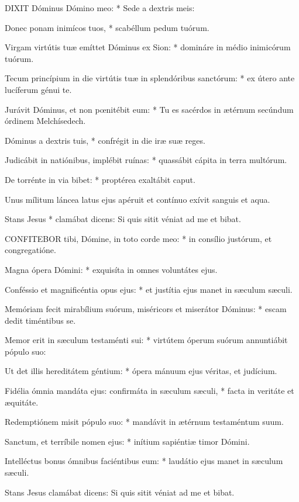 
\lettrine[lines=2]{D}{IXIT} Dóminus Dómino meo: * Sede a dextris meis:

Donec ponam inimícos tuos, * scabéllum pedum tuórum.

Virgam virtútis tuæ emíttet Dóminus ex Sion: * domináre in médio inimicórum tuórum.

Tecum princípium in die virtútis tuæ in splendóribus sanctórum: * ex útero ante lucíferum génui te.

Jurávit Dóminus, et non pœnitébit eum: * Tu es sacérdos in ætérnum secúndum órdinem Melchísedech.

Dóminus a dextris tuis, * confrégit in die iræ suæ reges.

Judicábit in natiónibus, implébit ruínas: * quassábit cápita in terra multórum.

De torrénte in via bibet: * proptérea exaltábit caput.

 Unus mílitum láncea latus ejus apéruit et contínuo exívit sanguis et aqua.

 Stans Jesus * clamábat dicens: Si quis sitit véniat ad me et bibat.


\lettrine[lines=2]{C}{ONFITEBOR} tibi, Dómine, in toto corde meo: * in consílio justórum, et congregatióne.

Magna ópera Dómini: * exquisíta in omnes voluntátes ejus.

Conféssio et magnificéntia opus ejus: * et justítia ejus manet in sæculum sæculi.

Memóriam fecit mirabílium suórum, miséricors et miserátor Dóminus: * escam dedit timéntibus se.

Memor erit in sæculum testaménti sui: * virtútem óperum suórum annuntiábit pópulo suo:

Ut det illis hereditátem géntium: * ópera mánuum ejus véritas, et judícium.

Fidélia ómnia mandáta ejus: confirmáta in sæculum sæculi, * facta in veritáte et æquitáte.

Redemptiónem misit pópulo suo: * mandávit in ætérnum testaméntum suum.

Sanctum, et terríbile nomen ejus: * inítium sapiéntiæ timor Dómini.

Intelléctus bonus ómnibus faciéntibus eum: * laudátio ejus manet in sæculum sæculi.

 Stans Jesus clamábat dicens: Si quis sitit véniat ad me et bibat.

